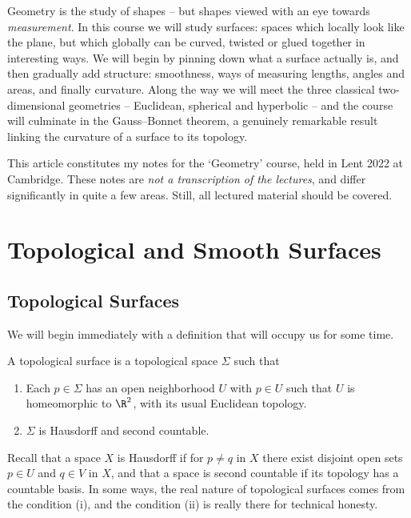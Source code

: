 



Geometry is the study of shapes -- but shapes viewed with an eye towards \emph{measurement}. In this course we will study surfaces: spaces which locally look like the plane, but which globally can be curved, twisted or glued together in interesting ways. We will begin by pinning down what a surface actually is, and then gradually add structure: smoothness, ways of measuring lengths, angles and areas, and finally curvature. Along the way we will meet the three classical two-dimensional geometries -- Euclidean, spherical and hyperbolic -- and the course will culminate in the Gauss--Bonnet theorem, a genuinely remarkable result linking the curvature of a surface to its topology.

This article constitutes my notes for the `Geometry' course, held in Lent 2022 at Cambridge. These notes are \emph{not a transcription of the lectures}, and differ significantly in quite a few areas. Still, all lectured material should be covered.





\section{Topological and Smooth Surfaces}

\subsection{Topological Surfaces}

We will begin immediately with a definition that will occupy us for some time.

\begin{definition}
    A topological surface is a topological space $\Sigma$ such that
    \begin{enumerate}[label=(\roman*)]
        \item Each $p \in \Sigma$ has an open neighborhood $U$ with $p \in U$ such that $U$ is homeomorphic to $\R^2$, with its usual Euclidean topology.
        \item $\Sigma$ is Hausdorff and second countable.
    \end{enumerate}    
\end{definition}

Recall that a space $X$ is Hausdorff if for $p \neq q$ in $X$ there exist disjoint open sets $p \in U$ and $q \in V$ in $X$, and that a space is second countable if its topology has a countable basis.
In some ways, the real nature of topological surfaces comes from the condition (i), and the condition (ii) is really there for technical honesty.


